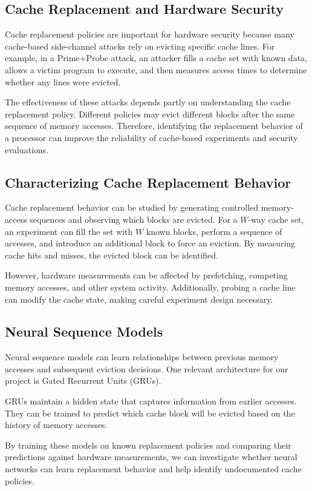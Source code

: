 \subsection{Cache Replacement and Hardware Security}
Cache replacement policies are important for hardware security because many cache-based side-channel attacks rely on evicting specific cache lines. For example, in a Prime+Probe attack, an attacker fills a cache set with known data, allows a victim program to execute, and then measures access times to determine whether any lines were evicted.

The effectiveness of these attacks depends partly on understanding the cache replacement policy. Different policies may evict different blocks after the same sequence of memory accesses. Therefore, identifying the replacement behavior of a processor can improve the reliability of cache-based experiments and security evaluations.


\subsection{Characterizing Cache Replacement Behavior}
Cache replacement behavior can be studied by generating controlled memory-access sequences and observing which blocks are evicted. For a $W$-way cache set, an experiment can fill the set with $W$ known blocks, perform a sequence of accesses, and introduce an additional block to force an eviction. By measuring cache hits and misses, the evicted block can be identified.

However, hardware measurements can be affected by prefetching, competing memory accesses, and other system activity. Additionally, probing a cache line can modify the cache state, making careful experiment design necessary.

\subsection{Neural Sequence Models}
Neural sequence models can learn relationships between previous memory accesses and subsequent eviction decisions. One relevant architecture for our project is Gated Recurrent Units (GRUs).

GRUs maintain a hidden state that captures information from earlier accesses. They can be trained to predict which cache block will be evicted based on the history of memory accesses.

By training these models on known replacement policies and comparing their predictions against hardware measurements, we can investigate whether neural networks can learn replacement behavior and help identify undocumented cache policies.